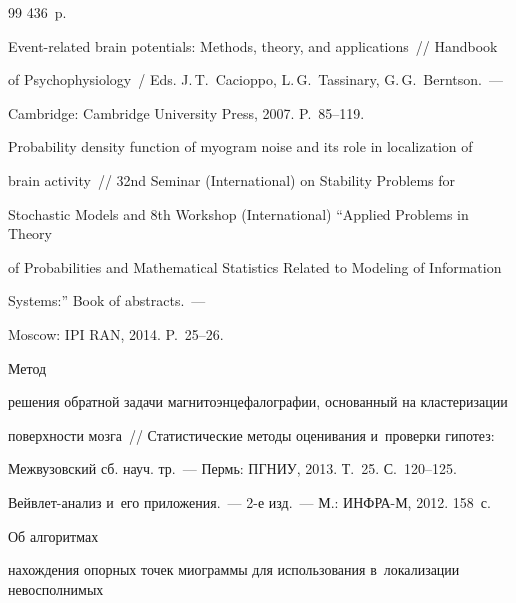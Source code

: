 {{\begin{thebibliography}{99}
436~p.





Event-related brain potentials: Methods, theory, and applications~/\!\!/  Handbook 

of Psychophysiology~/ Eds. J.\,T.~Cacioppo, L.\,G.~Tassinary, G.\,G.~Berntson.~--- 

Cambridge: Cambridge University Press, 2007. P.~85--119. 





Probability density function of myogram noise and its role in localization of 

brain activity~/\!\!/ 32nd  Seminar (International) on Stability Problems for 

Stochastic Models and 8th  Workshop (International) ``Applied Problems in Theory 

of Probabilities and Mathematical Statistics Related to Modeling of Information 

Systems:'' Book of abstracts.~---

Moscow: IPI RAN, 2014. P.~25--26.




 Метод 

решения обратной задачи магнитоэнцефалографии, основанный на кластеризации 

поверхности мозга~/\!\!/ Статистические методы оценивания и~проверки гипотез: 

Межвузовский сб. науч. тр.~--- Пермь: ПГНИУ, 2013.  Т.~25. С.~120--125.





Вейвлет-анализ и~его приложения.~--- 2-е изд.~--- М.: ИНФРА-М, 2012. 158~с.






 Об алгоритмах 

нахождения опорных точек миограммы для использования в~локализации невосполнимых 


\end{thebibliography}}}
